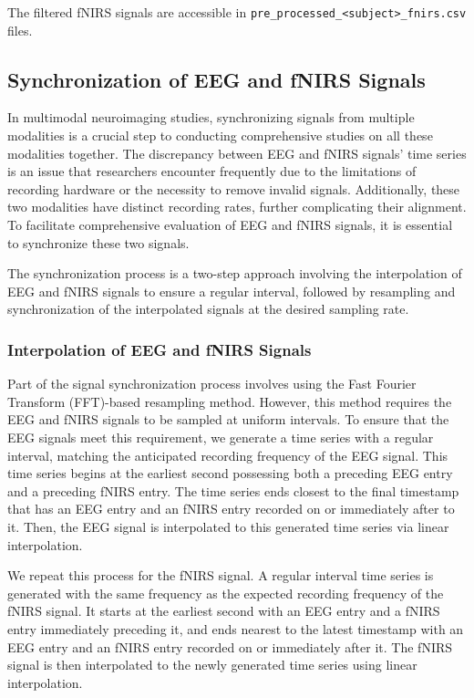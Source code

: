 The filtered fNIRS signals are accessible in \texttt{pre\_processed\_<subject>\_fnirs.csv} files.

\subsection{Synchronization of EEG and fNIRS Signals}

In multimodal neuroimaging studies, synchronizing signals from multiple modalities is a crucial step to conducting comprehensive studies on all these modalities together. The discrepancy between EEG and fNIRS signals' time series is an issue that researchers encounter frequently due to the limitations of recording hardware or the necessity to remove invalid signals. Additionally, these two modalities have distinct recording rates, further complicating their alignment. To facilitate comprehensive evaluation of EEG and fNIRS signals, it is essential to synchronize these two signals.

The synchronization process is a two-step approach involving the interpolation of EEG and fNIRS signals to ensure a regular interval, followed by resampling and synchronization of the interpolated signals at the desired sampling rate.

\subsubsection{Interpolation of EEG and fNIRS Signals}

Part of the signal synchronization process involves using the Fast Fourier Transform (FFT)-based resampling method. However, this method requires the EEG and fNIRS signals to be sampled at uniform intervals. To ensure that the EEG signals meet this requirement, we generate a time series with a regular interval, matching the anticipated recording frequency of the EEG signal. This time series begins at the earliest second possessing both a preceding EEG entry and a preceding fNIRS entry. The time series ends closest to the final timestamp that has an EEG entry and an fNIRS entry recorded on or immediately after to it. Then, the EEG signal is interpolated to this generated time series via linear interpolation.

We repeat this process for the fNIRS signal. A regular interval time series is generated with the same frequency as the expected recording frequency of the fNIRS signal. It starts at the earliest second with an EEG entry and a fNIRS entry immediately preceding it, and ends nearest to the latest timestamp with an EEG entry and an fNIRS entry recorded on or immediately after it. The fNIRS signal is then interpolated to the newly generated time series using linear interpolation.

